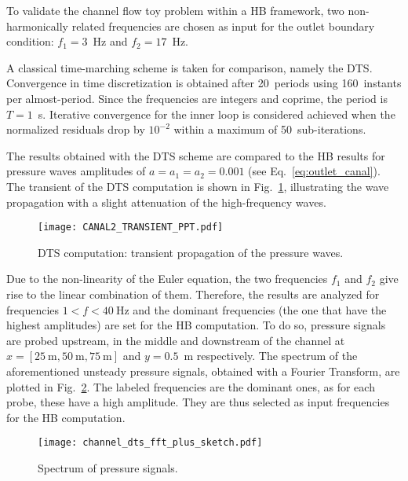To validate the channel flow toy problem within a HB framework, 
two non-harmonically related
frequencies are chosen as input for the outlet boundary condition:
$f_1 = 3$~Hz and $f_2 = 17$~Hz.

A classical time-marching scheme is taken for comparison, namely the DTS.
Convergence in time discretization is obtained after 20~periods using
160~instants per almost-period. Since the frequencies are integers and
coprime, the period is $T=1$~s.  Iterative convergence for the
inner loop is considered achieved when the normalized residuals drop
by $10^{-2}$ within a maximum of 50~sub-iterations.

The results obtained with the DTS scheme are compared to the HB
results for pressure waves amplitudes of $a = a_1 = a_2 = 0.001$
(see Eq.~\eqref{eq:outlet_canal}).  The
transient of the DTS computation is shown in
Fig.~\ref{fig:canal2_transient}, illustrating the wave propagation
with a slight attenuation of the high-frequency waves.
\begin{figure}[htb]
  \centering
  \texttt{[image: CANAL2\_TRANSIENT\_PPT.pdf]}
  \caption{DTS computation: transient propagation of the pressure waves.}
  \label{fig:canal2_transient}
\end{figure}


Due to the non-linearity of the Euler equation, the two frequencies
$f_1$ and $f_2$ give rise to the linear combination of them.
Therefore, the results are analyzed for frequencies $1<f< 40~\textrm{Hz}$ and the
dominant frequencies (the one that have the highest amplitudes) are
set for the HB computation.  To do so, pressure signals are probed
upstream, in the middle and downstream of the channel at
$x=[25~\textrm{m}, 50~\textrm{m}, 75~\textrm{m}]$ and $y=0.5$~m
respectively.  The spectrum of the aforementioned unsteady pressure
signals, obtained with a Fourier Transform, are plotted in
Fig.~\ref{fig:canal2_dts_fft}.  The labeled frequencies are the
dominant ones, as for each probe, these have a high amplitude. They
are thus selected as input frequencies for the HB computation.
\begin{figure}[htb]
  \centering
  \texttt{[image: channel\_dts\_fft\_plus\_sketch.pdf]}
  \caption{Spectrum of pressure signals.}
  \label{fig:canal2_dts_fft}
\end{figure}

